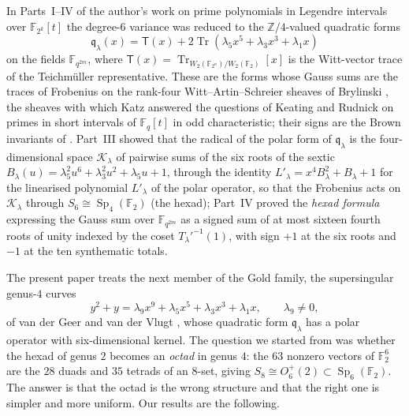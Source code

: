 \documentclass[12pt,a4paper]{amsart}
\theoremstyle{definition}
\newcommand{\F}{\mathbb{F}}
\newcommand{\Z}{\mathbb{Z}}
\newcommand{\Tr}{\operatorname{Tr}}
\newcommand{\Sp}{\operatorname{Sp}}
\newcommand{\Kk}{\mathcal{K}}
\newcommand{\qq}{\mathfrak{q}}
\newcommand{\Tw}{\mathsf{T}}
\begin{document}
In Parts~I--IV of the author's work on prime polynomials in Legendre intervals over $\F_{2^k}[t]$ \cite{ChenI,ChenII,ChenIII,ChenIV} the degree-$6$ variance was reduced to the $\Z/4$-valued quadratic forms
\[
\qq_\lambda(x)=\Tw(x)+2\Tr(\lambda_5x^5+\lambda_3x^3+\lambda_1x)
\]
on the fields $\F_{q^{2m}}$, where $\Tw(x)=\Tr_{W_2(\F_{2^n})/W_2(\F_2)}[x]$ is the Witt-vector trace of the Teichm\"uller representative. These are the forms whose Gauss sums are the traces of Frobenius on the rank-four Witt--Artin--Schreier sheaves of Brylinski \cite{Brylinski}, the sheaves with which Katz \cite{KatzKR,KatzEKR} answered the questions of Keating and Rudnick \cite{KeatingRudnick} on primes in short intervals of $\F_q[t]$ in odd characteristic; their signs are the Brown invariants of \cite{Brown}. Part~III showed that the radical of the polar form of $\qq_\lambda$ is the four-dimensional space $\Kk_\lambda$ of pairwise sums of the six roots of the sextic $B_\lambda(u)=\lambda_5^2u^6+\lambda_3^2u^2+\lambda_5u+1$, through the identity $L'_\lambda=x^4B_\lambda^2+B_\lambda+1$ for the linearised polynomial $L'_\lambda$ of the polar operator, so that the Frobenius acts on $\Kk_\lambda$ through $S_6\cong\Sp_4(\F_2)$ (the hexad); Part~IV proved the \emph{hexad formula} expressing the Gauss sum over $\F_{q^{2m}}$ as a signed sum of at most sixteen fourth roots of unity indexed by the coset $T_\lambda'^{-1}(1)$, with sign $+1$ at the six roots and $-1$ at the ten synthematic totals.

The present paper treats the next member of the Gold family, the supersingular genus-$4$ curves
\begin{equation}\label{eq:curve}
y^2+y=\lambda_9x^9+\lambda_5x^5+\lambda_3x^3+\lambda_1x,\qquad \lambda_9\ne0,
\end{equation}
of van der Geer and van der Vlugt \cite{vdGvdV}, whose quadratic form $\qq_\lambda$ has a polar operator with six-dimensional kernel. The question we started from was whether the hexad of genus $2$ becomes an \emph{octad} in genus $4$: the $63$ nonzero vectors of $\F_2^6$ are the $28$ duads and $35$ tetrads of an $8$-set, giving $S_8\cong O_6^+(2)\subset\Sp_6(\F_2)$. The answer is that the octad is the wrong structure and that the right one is simpler and more uniform. Our results are the following.
\end{document}
